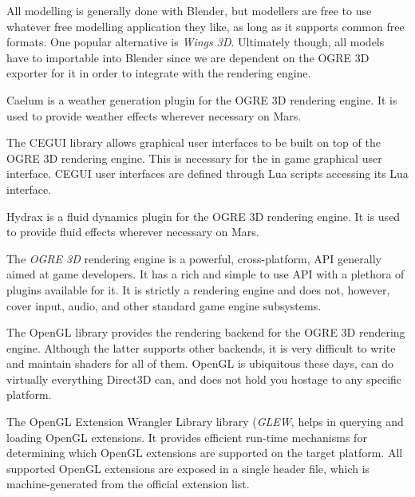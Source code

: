 
\startitemize[3]
\setupwhitespace[big]

All modelling is generally done with Blender, but modellers are free to use whatever free modelling application they like, as long as it supports common free formats. One popular alternative is {\it Wings 3D}. Ultimately though, all models have to importable into Blender since we are dependent on the OGRE 3D exporter for it in order to integrate with the rendering engine.


Caelum is a weather generation plugin for the OGRE 3D rendering engine. It is used to provide weather effects wherever necessary on Mars.


The CEGUI library allows graphical user interfaces to be built on top of the OGRE 3D rendering engine. This is necessary for the in game graphical user interface. CEGUI user interfaces are defined through Lua scripts accessing its Lua interface.


Hydrax is a fluid dynamics plugin for the OGRE 3D rendering engine. It is used to provide fluid effects wherever necessary on Mars.


The {\it OGRE 3D} rendering engine is a powerful, cross-platform, API generally aimed at game developers. It has a rich and simple to use API with a plethora of plugins available for it. It is strictly a rendering engine and does not, however, cover input, audio, and other standard game engine subsystems.


The OpenGL library provides the rendering backend for the OGRE 3D rendering engine. Although the latter supports other backends, it is very difficult to write and maintain shaders for all of them. OpenGL is ubiquitous these days, can do virtually everything Direct3D can, and does not hold you hostage to any specific platform.


The OpenGL Extension Wrangler Library library ({\it GLEW}, helps in querying and loading OpenGL extensions. It provides efficient run-time mechanisms for determining which OpenGL extensions are supported on the target platform. All supported OpenGL extensions are exposed in a single header file, which is machine-generated from the official extension list.

